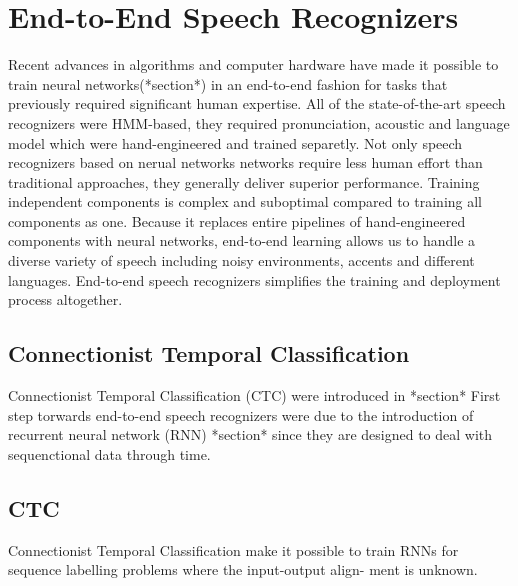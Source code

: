 \section{End-to-End Speech Recognizers}

Recent advances in algorithms and computer hardware have made it possible to train neural networks(*section*) in an end-to-end fashion for tasks that previously required significant human expertise.
All of the state-of-the-art speech recognizers were HMM-based, they required pronunciation, acoustic and language model which were hand-engineered and trained separetly.
Not only speech recognizers based on nerual networks networks require less human effort than traditional approaches, they generally deliver superior performance.
Training independent components is complex and suboptimal compared to training all components as one.
Because it replaces entire pipelines of hand-engineered components with neural networks, end-to-end learning allows us to handle a diverse variety of speech including noisy environments, accents and different languages.
End-to-end speech recognizers simplifies the training and deployment process altogether.

\subsection{Connectionist Temporal Classification}

Connectionist Temporal Classification (CTC) were introduced in *section*
First step torwards end-to-end speech recognizers were due to the introduction of recurrent neural network (RNN) *section* since they are designed to deal with sequenctional data through time.

\subsection{CTC}

Connectionist Temporal Classification make it possible to train RNNs for sequence labelling problems where the input-output align- ment is unknown.
